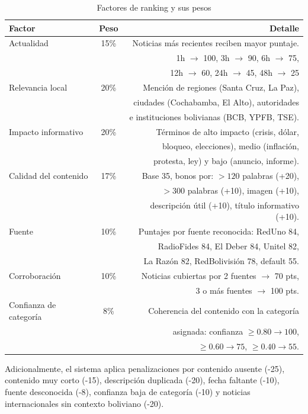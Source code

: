 \begin{table}[H]
\centering
\begin{tabular}{lcr}
\toprule
\textbf{Factor} & \textbf{Peso} & \textbf{Detalle} \\
\midrule
Actualidad & 15\% & Noticias m\'as recientes reciben mayor puntaje. \\
& & 1h $\to$ 100, 3h $\to$ 90, 6h $\to$ 75, \\
& & 12h $\to$ 60, 24h $\to$ 45, 48h $\to$ 25 \\
\midrule
Relevancia local & 20\% & Menci\'on de regiones (Santa Cruz, La Paz), \\
& & ciudades (Cochabamba, El Alto), autoridades \\
& & e instituciones bolivianas (BCB, YPFB, TSE). \\
\midrule
Impacto informativo & 20\% & T\'erminos de alto impacto (crisis, d\'olar, \\
& & bloqueo, elecciones), medio (inflaci\'on, \\
& & protesta, ley) y bajo (anuncio, informe). \\
\midrule
Calidad del contenido & 17\% & Base 35, bonos por: $>120$ palabras (+20), \\
& & $>300$ palabras (+10), imagen (+10), \\
& & descripci\'on \'util (+10), t\'itulo informativo (+10). \\
\midrule
Fuente & 10\% & Puntajes por fuente reconocida: RedUno 84, \\
& & RadioFides 84, El Deber 84, Unitel 82, \\
& & La Raz\'on 82, RedBolivisi\'on 78, default 55. \\
\midrule
Corroboraci\'on & 10\% & Noticias cubiertas por 2 fuentes $\to$ 70 pts, \\
& & 3 o m\'as fuentes $\to$ 100 pts. \\
\midrule
Confianza de categor\'ia & 8\% & Coherencia del contenido con la categor\'ia \\
& & asignada: confianza $\ge 0.80 \to 100$, \\
& & $\ge 0.60 \to 75$, $\ge 0.40 \to 55$. \\
\bottomrule
\end{tabular}
\caption{Factores de ranking y sus pesos}
\end{table}

Adicionalmente, el sistema aplica penalizaciones por contenido ausente (-25), contenido muy corto (-15), descripci\'on duplicada (-20), fecha faltante (-10), fuente desconocida (-8), confianza baja de categor\'ia (-10) y noticias internacionales sin contexto boliviano (-20).

